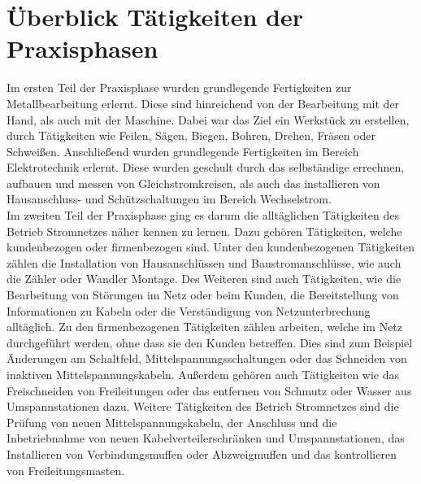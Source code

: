\chapter*{Überblick Tätigkeiten der Praxisphasen} %

Im ersten Teil der Praxisphase wurden grundlegende Fertigkeiten zur Metallbearbeitung erlernt. Diese sind hinreichend von der Bearbeitung mit der Hand, 
als auch mit der Maschine. Dabei war das Ziel ein Werkstück zu erstellen, durch Tätigkeiten wie Feilen, Sägen, Biegen, Bohren, Drehen, Fräsen oder Schweißen. 
Anschließend wurden grundlegende Fertigkeiten im Bereich Elektrotechnik erlernt. Diese wurden geschult durch das selbständige errechnen, aufbauen und messen 
von Gleichstromkreisen, als auch das installieren von Hausanschluss- und Schützschaltungen im Bereich Wechselstrom.\\
Im zweiten Teil der Praxisphase ging es darum die alltäglichen Tätigkeiten des Betrieb Stromnetzes näher kennen zu lernen. Dazu gehören Tätigkeiten, 
welche kundenbezogen oder firmenbezogen sind. Unter den kundenbezogenen Tätigkeiten zählen die Installation von Hausanschlüssen und Baustromanschlüsse, 
wie auch die Zähler oder Wandler Montage. Des Weiteren sind auch Tätigkeiten, wie die Bearbeitung von Störungen im Netz oder beim Kunden, die Bereitstellung 
von Informationen zu Kabeln oder die Verständigung von Netzunterbrechung alltäglich. Zu den firmenbezogenen Tätigkeiten zählen arbeiten, welche im Netz 
durchgeführt werden, ohne dass sie den Kunden betreffen. Dies sind zum Beispiel Änderungen am Schaltfeld, Mittelspannungsschaltungen oder das Schneiden von 
inaktiven Mittelspannungskabeln. Außerdem gehören auch Tätigkeiten wie das Freischneiden von Freileitungen oder das entfernen von Schmutz oder Wasser aus 
Umspannstationen dazu. Weitere Tätigkeiten des Betrieb Stromnetzes sind die Prüfung von neuen Mittelspannungskabeln, der Anschluss und die Inbetriebnahme 
von neuen Kabelverteilerschränken und Umspannstationen, das Installieren von Verbindungsmuffen oder Abzweigmuffen und das kontrollieren von Freileitungsmasten.


\cleardoublepage
